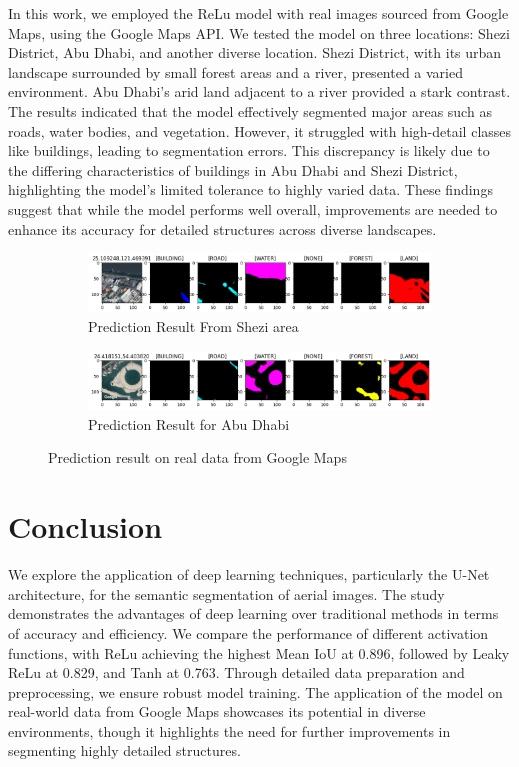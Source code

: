 \documentclass[conference]{IEEEtran}
\begin{document}
In this work, we employed the ReLu model with real images sourced from Google Maps, using the Google Maps API. We tested the model on three locations: Shezi District, Abu Dhabi, and another diverse location. Shezi District, with its urban landscape surrounded by small forest areas and a river, presented a varied environment. Abu Dhabi's arid land adjacent to a river provided a stark contrast. The results indicated that the model effectively segmented major areas such as roads, water bodies, and vegetation. However, it struggled with high-detail classes like buildings, leading to segmentation errors. This discrepancy is likely due to the differing characteristics of buildings in Abu Dhabi and Shezi District, highlighting the model's limited tolerance to highly varied data. These findings suggest that while the model performs well overall, improvements are needed to enhance its accuracy for detailed structures across diverse landscapes.

\begin{figure}[p!]
    \centering
    \begin{subfigure}[t]{\textwidth}
        \centering
        \includegraphics[width=\textwidth]{gmaps.png} 
        \caption{Prediction Result From Shezi area}
        \label{fig:shezi}
    \end{subfigure}
    \begin{subfigure}[t]{\textwidth}
        \centering
        \includegraphics[width=\textwidth]{gmaps2.png} 
        \caption{Prediction Result for Abu Dhabi}
        \label{fig:abu_dhabi}
    \end{subfigure}
    \caption{Prediction result on real data from Google Maps}
    \label{fig:real_data}
\end{figure}

\section{Conclusion}
We explore the application of deep learning techniques, particularly the U-Net architecture, for the semantic segmentation of aerial images. The study demonstrates the advantages of deep learning over traditional methods in terms of accuracy and efficiency. We compare the performance of different activation functions, with ReLu achieving the highest Mean IoU at 0.896, followed by Leaky ReLu at 0.829, and Tanh at 0.763. Through detailed data preparation and preprocessing, we ensure robust model training. The application of the model on real-world data from Google Maps showcases its potential in diverse environments, though it highlights the need for further improvements in segmenting highly detailed structures.



\end{document}
